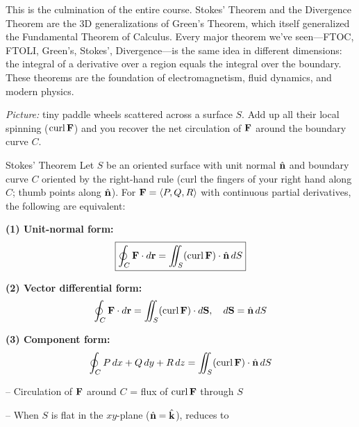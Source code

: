 \documentclass[11pt]{article}
\begin{document}

\begin{background}
This is the culmination of the entire course. Stokes' Theorem and the Divergence Theorem are the 3D generalizations of Green's Theorem, which itself generalized the Fundamental Theorem of Calculus. Every major theorem we've seen---FTOC, FTOLI, Green's, Stokes', Divergence---is the same idea in different dimensions: the integral of a derivative over a region equals the integral over the boundary. These theorems are the foundation of electromagnetism, fluid dynamics, and modern physics.
\end{background}


\textit{Picture:} tiny paddle wheels scattered across a surface $S$. Add up all their local spinning ($\operatorname{curl}\mathbf{F}$) and you recover the net circulation of $\mathbf{F}$ around the boundary curve $C$.

\begin{thmbox}{Stokes' Theorem}
Let $S$ be an oriented surface with unit normal $\hat{\mathbf{n}}$ and boundary curve $C$ oriented by the right-hand rule (curl the fingers of your right hand along $C$; thumb points along $\hat{\mathbf{n}}$). For $\mathbf{F} = \left\langle P,Q,R \right\rangle$ with continuous partial derivatives, the following are equivalent:

\smallskip
\textbf{(1) Unit-normal form:}
\[\boxed{\oint_C \mathbf{F}\cdot d\mathbf{r} = \iint_S (\operatorname{curl}\mathbf{F})\cdot \hat{\mathbf{n}}\,dS}\]

\textbf{(2) Vector differential form:}
\[\oint_C \mathbf{F}\cdot d\mathbf{r} = \iint_S (\operatorname{curl}\mathbf{F})\cdot d\mathbf{S}, \quad d\mathbf{S} = \hat{\mathbf{n}}\,dS\]

\textbf{(3) Component form:}
\[\oint_C P\,dx + Q\,dy + R\,dz = \iint_S (\operatorname{curl}\mathbf{F})\cdot\hat{\mathbf{n}}\,dS\]

\smallskip
-- Circulation of $\mathbf{F}$ around $C$ = flux of $\operatorname{curl}\mathbf{F}$ through $S$

-- When $S$ is flat in the $xy$-plane ($\hat{\mathbf{n}} = \hat{\mathbf{k}}$), reduces to 
\end{thmbox}
\end{document}
